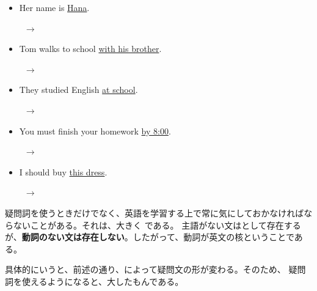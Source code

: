     \begin{itemize}
        \item Her name is \underline{Hana}.
        \par\vspace{0.3em}
        \noindent{}\ $\longrightarrow$\ 
        \par\vspace{0.5em}
        \item Tom walks to school \underline{with his brother}.
        \par\vspace{0.3em}
        \noindent{}\ $\longrightarrow$\ 
        \par\vspace{0.5em}
        \item They studied English \underline{at school}.
        \par\vspace{0.3em}
        \noindent{}\ $\longrightarrow$\ 
        \par\vspace{0.5em}
        \item You must finish your homework \underline{by 8:00}.
        \par\vspace{0.3em}
        \noindent{}\ $\longrightarrow$\ 
        \par\vspace{0.5em}
        \item I should buy \underline{this dress}.
        \par\vspace{0.3em}
        \noindent{}\ $\longrightarrow$\ 
        \par\vspace{0.5em}
    \end{itemize}

\vspace{2em}

    疑問詞を使うときだけでなく、英語を学習する上で常に気にしておかなければならないことがある。それは、大きく である。
    主語がない文はとして存在するが、\textbf{動詞のない文は存在しない}。したがって、動詞が英文の核ということである。

    具体的にいうと、前述の通り、によって疑問文の形が変わる。そのため、
    疑問詞を使えるようになると、大したもんである。

\newpage

